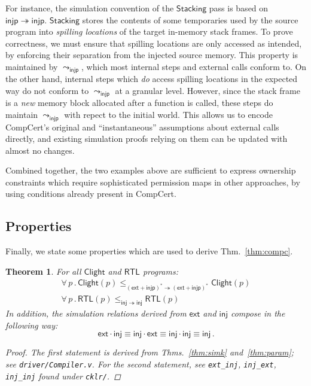 \documentclass[draft,11pt]{report}
\newtheorem{theorem}{Theorem}
\newcommand{\kw}[1]{\ensuremath{ \mathsf{#1} }}
\begin{document}
For instance,
the simulation convention of the \kw{Stacking} pass
is based on $\kw{injp} \twoheadrightarrow \kw{injp}$.
\kw{Stacking} stores the contents of some
temporaries used by the source program
into \emph{spilling locations}
of the target in-memory stack frames.
To prove correctness,
we must ensure that spilling locations
are only accessed as intended,
by enforcing their separation
from the injected source memory.
%
This property is maintained by $\leadsto_\kw{injp}$,
which most internal steps and external calls conform to.
On the other hand,
internal steps which \emph{do} access spilling locations
in the expected way
do not conform to $\leadsto_\kw{injp}$ at a granular level.
However,
since the stack frame is a \emph{new}
memory block allocated after a function is called,
these steps do maintain $\leadsto_\kw{injp}$
with repect to the initial world.
This allows us to encode CompCert's original and
``instantaneous'' assumptions about external calls directly,
and existing simulation proofs relying on them
can be updated with almost no changes.

Combined together,
the two examples above are sufficient to express
ownership constraints which require
sophisticated permission maps in other approaches,
by using conditions already present in CompCert.


\subsection{Properties} \label{sec:cklr-props} %

Finally,
we state some properties which are used
to derive Thm.~\ref{thm:compc}.

\begin{theorem} \label{thm:cklr-props}
For all $\kw{Clight}$ and $\kw{RTL}$ programs:
\begin{gather*}
\forall \, p \,.\,
  \kw{Clight}(p)
  \le_{(\kw{ext} + \kw{injp})^* \twoheadrightarrow (\kw{ext} + \kw{injp})^*}
  \kw{Clight}(p) \\
\forall \, p \,.\,
  \kw{RTL}(p)
  \le_{\kw{inj} \twoheadrightarrow \kw{inj}}
  \kw{RTL}(p)
\end{gather*}
In addition,
the simulation relations derived from $\kw{ext}$ and $\kw{inj}$
compose in the following way:
\[
  \kw{ext} \cdot \kw{inj} \equiv
  \kw{inj} \cdot \kw{ext} \equiv
  \kw{inj} \cdot \kw{inj} \equiv
  \kw{inj} \,.
\]
\begin{proof}
The first statement is derived from
Thms.~\ref{thm:simk} and~\ref{thm:param};
see \texttt{driver/Compiler.v}.
For the second statement, see
\texttt{ext\_inj}, \texttt{inj\_ext}, \texttt{inj\_inj}
found under \texttt{cklr/}.
\end{proof}
\end{theorem}
\end{document}
